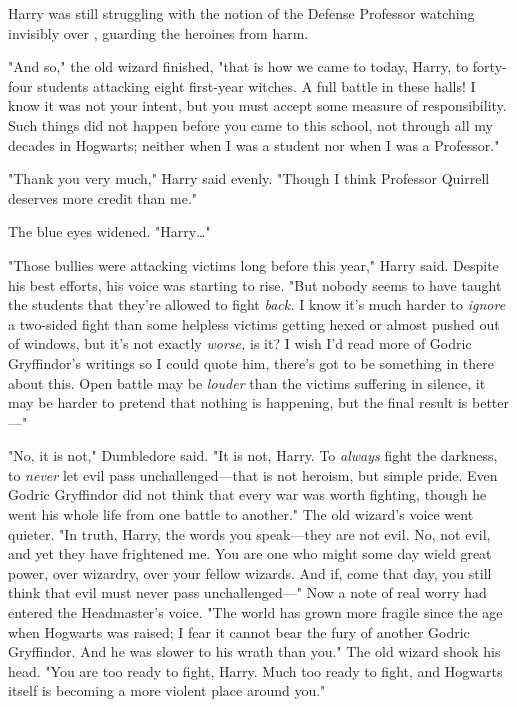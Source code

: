 Harry was still struggling with the notion of the Defense Professor watching
invisibly over \SPHEW, guarding the heroines from harm.

"And so," the old wizard finished, "that is how we came to today, Harry, to
forty-four students attacking eight first-year witches. A full battle in these
halls! I know it was not your intent, but you must accept some measure of
responsibility. Such things did not happen before you came to this school, not
through all my decades in Hogwarts; neither when I was a student nor when I was
a Professor."

"Thank you very much," Harry said evenly. "Though I think Professor Quirrell
deserves more credit than me."

The blue eyes widened. "Harry{\ldots}"

"Those bullies were attacking victims long before this year," Harry said.
Despite his best efforts, his voice was starting to rise. "But nobody seems to
have taught the students that they're allowed to fight \emph{back.} I know it's
much harder to \emph{ignore} a two-sided fight than some helpless victims
getting hexed or almost pushed out of windows, but it's not exactly
\emph{worse,} is it? I wish I'd read more of Godric Gryffindor's writings so I
could quote him, there's got to be something in there about this. Open battle
may be \emph{louder} than the victims suffering in silence, it may be harder to
pretend that nothing is happening, but the final result is better---"

"No, it is not," Dumbledore said. "It is not, Harry. To \emph{always} fight the
darkness, to \emph{never} let evil pass unchallenged---that is not heroism, but
simple pride. Even Godric Gryffindor did not think that every war was worth
fighting, though he went his whole life from one battle to another." The old
wizard's voice went quieter. "In truth, Harry, the words you speak---they are
not evil. No, not evil, and yet they have frightened me. You are one who might
some day wield great power, over wizardry, over your fellow wizards. And if,
come that day, you still think that evil must never pass unchallenged---" Now a
note of real worry had entered the Headmaster's voice. "The world has grown
more fragile since the age when Hogwarts was raised; I fear it cannot bear the
fury of another Godric Gryffindor. And he was slower to his wrath than you."
The old wizard shook his head. "You are too ready to fight, Harry. Much too
ready to fight, and Hogwarts itself is becoming a more violent place around
you."

